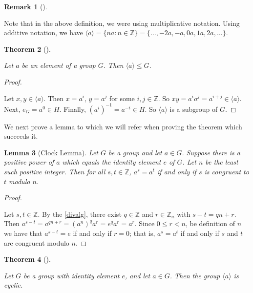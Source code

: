 \documentclass[10pt,]{book}
\theoremstyle{plain}
\newtheorem{theorem}{Theorem}[section]
\newtheorem{lemma}[theorem]{Lemma}
\theoremstyle{definition}
\theoremstyle{definition}
\newtheorem{remark}[theorem]{Remark}
\theoremstyle{definition}
\theoremstyle{definition}
\numberwithin{equation}{section}
\def\Z{\mathbb{Z}}
\newcommand{\lt}{ < }
\begin{document}
\begin{remark}[]\label{remark-21}

      Note that in the above definition, we were using
      multiplicative notation. Using additive notation, we have
      \(\langle a\rangle =\{na:n\in \Z\}=\{\ldots, -2a, -a, 0a, 1a, 2a, \ldots\}.\)
\end{remark}
\begin{theorem}[{}]\label{theorem-20}

        Let \(a\) be an element of a group \(G\). Then \(\langle a\rangle \leq G\).
\end{theorem}
\begin{proof}\hypertarget{proof-21}{}

      Let \(x,y\in \langle a\rangle\). Then \(x=a^i\), \(y=a^j\) for some \(i,j\in \Z\). So \(xy=a^ia^j=a^{i+j}\in \langle a\rangle\). Next, \(e_G=a^0\in H\). Finally, \((a^i)^{-1}=a^{-i}\in H\). So \(\langle a\rangle\) is a subgroup of \(G\).
\end{proof}
\par
We next prove a lemma to which we will refer when proving the theorem which succeeds it.%
\begin{lemma}[{Clock Lemma}]\label{clock}
 Let \(G\) be a group and let \(a \in G\). Suppose there is a positive power of \(a\) which equals the identity element \(e\) of \(G\). Let \(n\) be the least such positive integer. Then for all \(s,t\in \Z\), \(a^s=a^t\) if and only if \(s\) is congruent to \(t\) modulo \(n\).
\end{lemma}
\begin{proof}\hypertarget{proof-22}{}

     Let \(s,t\in \Z\). By the \hyperref[divalg]{\ref{divalg}}, there exist \(q\in \Z\) and \(r\in \Z_n\) with \(s-t=qn+r\). Then \(a^{s-t}=a^{qn+r}=(a^n)^qa^r=e^qa^r=a^r\). Since \(0\leq r\lt n\), be definition of \(n\) we have that \(a^{s-t}=e\) if and only if \(r=0\); that is, \(a^s=a^t\) if and only if \(s\) and \(t\) are congruent modulo \(n\).
\end{proof}
\begin{theorem}[{}]\label{theorem-21}

        Let \(G\) be a group with identity element \(e\), and let \(a\in G\). Then the group \(\langle a\rangle\) is cyclic.
\end{theorem}
\end{document}
